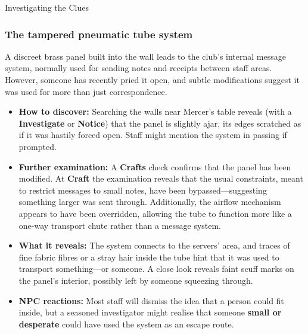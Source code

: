 \begin{CommentBox}{Investigating the Clues}

	\subsubsection*{The tampered pneumatic tube system}
	A discreet brass panel built into the wall leads to the club’s internal message system, normally used for sending notes and receipts between staff areas. However, someone has recently pried it open, and subtle modifications suggest it was used for more than just correspondence.

	\begin{itemize}
		\item \textbf{How to discover:} Searching the walls near Mercer's table reveals (with a \Difficult \textbf{Investigate} or \textbf{Notice}) that the panel is slightly ajar, its edges scratched as if it was hastily forced open. Staff might mention the system in passing if prompted.
		\item \textbf{Further examination:} A \Challenging \textbf{Crafts} check confirms that the panel has been modified. At \Difficult \textbf{Craft} the examination reveals that the usual constraints, meant to restrict messages to small notes, have been bypassed—suggesting something larger was sent through. Additionally, the airflow mechanism appears to have been overridden, allowing the tube to function more like a one-way transport chute rather than a message system.
		\item \textbf{What it reveals:} The system connects to the servers' area, and traces of fine fabric fibres or a stray hair inside the tube hint that it was used to transport something—or someone. A close look reveals faint scuff marks on the panel's interior, possibly left by someone squeezing through.
		\item \textbf{NPC reactions:} Most staff will dismiss the idea that a person could fit inside, but a seasoned investigator might realise that someone \textbf{small or desperate} could have used the system as an escape route.
	\end{itemize}
\end{CommentBox}
\newpage